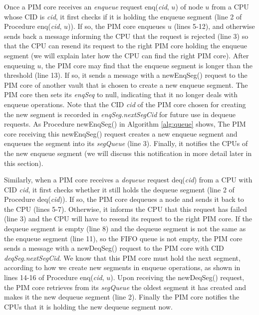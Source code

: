 Once a PIM core receives an \emph{enqueue} request enq(\textit{cid}, $u$) of node $u$ from a CPU whose CID is \textit{cid},
it first checks if it is holding the enqueue segment (line 2 of Procedure enq(\textit{cid}, $u$)).
If so, the PIM core enqueues $u$ (lines 5-12), and otherwise sends back a message
informing the CPU that the request is rejected (line 3) so that
the CPU can resend its request to the right PIM core holding the enqueue segment
(we will explain later how the CPU can find the right PIM core).
After enqueuing $u$, the PIM core may find that the enqueue segment is longer than the threshold (line 13).
If so, it sends a message with a newEnqSeg() request to the PIM core of another vault that is chosen 
to create a new enqueue segment.
The PIM core then sets its \textit{enqSeq} to null, indicating that it no longer deals with enqueue operations.
Note that the CID \textit{cid} of the PIM core chosen for creating the new segment is recorded in 
\textit{enqSeg.nextSegCid} for future use in dequeue requests.
As Procedure newEnqSeg() in Algorithm \ref{alg:queue} shows,
The PIM core receiving this newEnqSeg() request creates a new enqueue segment and 
enqueues the segment into its \textit{segQueue} (line 3).
Finally, it notifies the CPUs of the new enqueue segment 
(we will discuss this notification in more detail later in this section).

Similarly, when a PIM core receives a \emph{dequeue} request deq(\textit{cid}) from a CPU with CID \textit{cid},
it first checks whether it still holds the dequeue segment (line 2 of Procedure deq(\textit{cid})).
If so, the PIM core dequeues a node and sends it back to the CPU (lines 5-7).
Otherwise, it informs the CPU that this request has failed (line 3) and
the CPU will have to resend its request to the right PIM core.
If the dequeue segment is empty (line 8) and the dequeue segment is not the same as 
the enqueue segment (line 11), so the FIFO queue is not empty, 
the PIM core sends a message with a newDeqSeg() request 
to the PIM core with CID \textit{deqSeg.nextSegCid}. 
We know that this PIM core must hold the next segment, 
according to how we create new segments in enqueue operations, 
as shown in lines 14-16 of Procedure enq(\textit{cid}, $u$). 
Upon receiving the newDeqSeg() request, 
the PIM core retrieves from its \textit{segQueue} the oldest segment it has created and 
makes it the new dequeue segment (line 2). 
Finally the PIM core notifies the CPUs that it is holding the new dequeue segment now.

